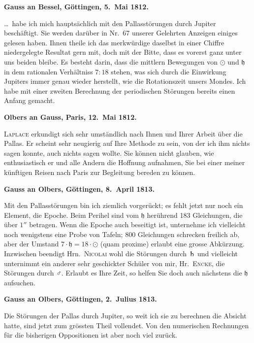 \documentclass[12pt,a4paper]{article}
\newcommand{\Ceres}{\odot}
\newcommand{\Jupiter}{\mathfrak{h}}
\begin{document}
\newpage
\setcounter{page}{431}
%
\medskip\noindent
\textbf{Gauss an Bessel, Göttingen, 5.~Mai 1812.}

\ldots\ habe ich mich hauptsächlich mit den Pallasstörungen durch Jupiter beschäftigt. Sie werden darüber in Nr.~67 unserer Gelehrten Anzeigen einiges gelesen haben. Ihnen theile ich das merkwürdige daselbst in einer Chiffre niedergelegte Resultat gern mit, doch mit der Bitte, dass es vorerst ganz unter uns beiden bleibe. Es besteht darin, dass die mittlern Bewegungen von $\Ceres$ und $\Jupiter$ in dem rationalen Verhältniss $7:18$ stehen, was sich durch die Einwirkung Jupiters immer genau wieder herstellt, wie die Rotationszeit unsers Mondes. Ich habe mit einer zweiten Berechnung der periodischen Störungen bereits einen Anfang gemacht.

\medskip\noindent
\textbf{Olbers an Gauss, Paris, 12.~Mai 1812.}

{ \textsc{Laplace} erkundigt sich sehr umständlich nach Ihnen und Ihrer Arbeit über die Pallas. Er scheint sehr neugierig auf Ihre Methode zu sein, von der ich ihm nichts sagen konnte, auch nichts sagen wollte. Sie können nicht glauben, wie enthusiastisch er und alle Andern die Hoffnung aufnahmen, Sie bei einer meiner künftigen Reisen nach Paris zur Begleitung bereden zu können. }

\newpage
\setcounter{page}{432}
%
\medskip\noindent
\textbf{Gauss an Olbers, Göttingen, 8.~April 1813.}

Mit den Pallasstörungen bin ich ziemlich vorgerückt; es fehlt jetzt nur noch ein Element, die Epoche. Beim Perihel sind vom $\Jupiter$ herührend 183 Gleichungen, die über $1''$ betragen. Wenn die Epoche auch beseitigt ist, unternehme ich vielleicht noch wenigstens eine Probe von Tafeln; 800 Gleichungen schrecken freilich ab, aber der Umstand $7 \cdot \Jupiter = 18 \cdot \Ceres$ (quam proxime) erlaubt eine grosse Abkürzung. Inzwischen beendigt Hrn.~\textsc{Nicolai} wohl die Störungen durch $\Saturn$ und vielleicht unternimmt ein anderer sehr geschickter Schüler von mir, Hr.~\textsc{Encke}, die Störungen durch $\Mars$. Erlaubt es Ihre Zeit, so helfen Sie doch auch nächstens die $\Jupiter$ aufsuchen.

\medskip\noindent
\textbf{Gauss an Olbers, Göttingen, 2.~Julius 1813.}

Die Störungen der Pallas durch Jupiter, so weit ich sie zu berechnen die Absicht hatte, sind jetzt zum grössten Theil vollendet. Von den numerischen Rechnungen für die bisherigen Oppositionen ist aber noch viel zurück.
\end{document}
